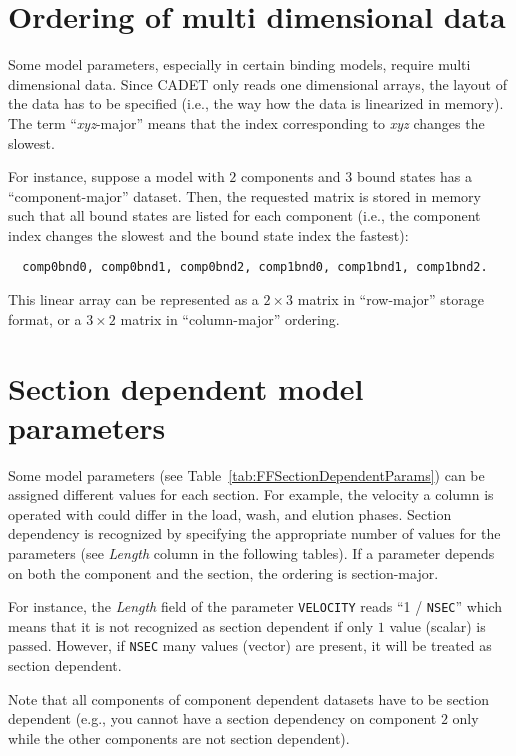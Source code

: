 \FloatBarrier
\section{Ordering of multi dimensional data}

Some model parameters, especially in certain binding models, require multi dimensional data.
Since CADET only reads one dimensional arrays, the layout of the data has to be specified (i.e., the way how the data is linearized in memory).
The term ``\emph{xyz}-major'' means that the index corresponding to \emph{xyz} changes the slowest.

For instance, suppose a model with $2$ components and $3$ bound states has a ``component-major'' dataset.
Then, the requested matrix is stored in memory such that all bound states are listed for each component (i.e., the component index changes the slowest and the bound state index the fastest):
\begin{verbatim}
  comp0bnd0, comp0bnd1, comp0bnd2, comp1bnd0, comp1bnd1, comp1bnd2.
\end{verbatim}
This linear array can be represented as a $2 \times 3$ matrix in ``row-major'' storage format, or a $3 \times 2$ matrix in ``column-major'' ordering.

\section{Section dependent model parameters}

Some model parameters (see Table~\ref{tab:FFSectionDependentParams}) can be assigned different values for each section. For example, the velocity a column is operated with could differ in the load, wash, and elution phases.
Section dependency is recognized by specifying the appropriate number of values for the parameters (see \emph{Length} column in the following tables).
If a parameter depends on both the component and the section, the ordering is section-major.

For instance, the \emph{Length} field of the parameter \texttt{VELOCITY} reads ``1 / \texttt{NSEC}'' which means that it is not recognized as section dependent if only $1$ value (scalar) is passed.
However, if \texttt{NSEC} many values (vector) are present, it will be treated as section dependent.

Note that all components of component dependent datasets have to be section dependent (e.g., you cannot have a section dependency on component $2$ only while the other components are not section dependent).

